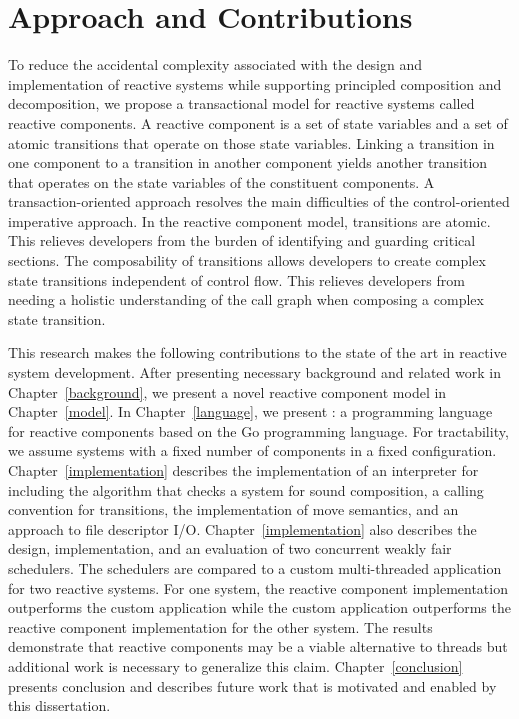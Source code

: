 \section{Approach and Contributions}

To reduce the accidental complexity associated with the design and implementation of reactive systems while supporting principled composition and decomposition, we propose a transactional model for reactive systems called reactive components.
A reactive component is a set of state variables and a set of atomic transitions that operate on those state variables.
Linking a transition in one component to a transition in another component yields another transition that operates on the state variables of the constituent components.
A transaction-oriented approach resolves the main difficulties of the control-oriented imperative approach.
In the reactive component model, transitions are atomic.
This relieves developers from the burden of identifying and guarding critical sections.
The composability of transitions allows developers to create complex state transitions independent of control flow.
This relieves developers from needing a holistic understanding of the call graph when composing a complex state transition.

This research makes the following contributions to the state of the art in reactive system development.
After presenting necessary background and related work in Chapter~\ref{background}, we present a novel reactive component model in Chapter~\ref{model}.
In Chapter~\ref{language}, we present \rcgo{}:  a programming language for reactive components based on the Go programming language.
For tractability, we assume systems with a fixed number of components in a fixed configuration.
Chapter~\ref{implementation} describes the implementation of an interpreter for \rcgo{} including the algorithm that checks a system for sound composition, a calling convention for transitions, the implementation of move semantics, and an approach to file descriptor I/O.
Chapter~\ref{implementation} also describes the design, implementation, and an evaluation of two concurrent weakly fair schedulers.
The schedulers are compared to a custom multi-threaded application for two reactive systems.
For one system, the reactive component implementation outperforms the custom application while the custom application outperforms the reactive component implementation for the other system.
The results demonstrate that reactive components may be a viable alternative to threads but additional work is necessary to generalize this claim.
Chapter~\ref{conclusion} presents conclusion and describes future work that is motivated and enabled by this dissertation.
